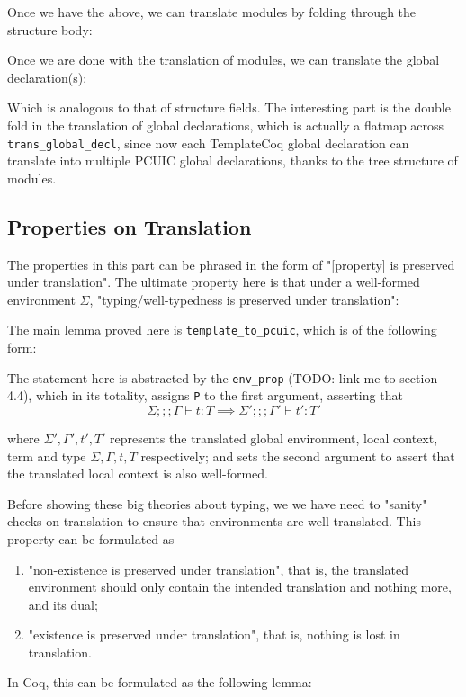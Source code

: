 Once we have the above, we can translate modules by folding through the
structure body:


Once we are done with the translation of modules, we can translate the global
declaration(s):


Which is analogous to that of structure fields. The interesting part is the
double fold in the translation of global declarations, which is actually a
flatmap across \verb|trans_global_decl|, since now each TemplateCoq global
declaration can translate into multiple PCUIC global declarations, thanks to the
tree structure of modules.


\subsection*{Properties on Translation}


The properties in this part can be phrased in the form of "[property] is
preserved under translation". The ultimate property here is that
under a well-formed environment $\Sigma$, "typing/well-typedness is preserved
under translation":


The main lemma proved here is \verb|template_to_pcuic|, which is of the
following form:


The statement here is abstracted by the \verb|env_prop| (TODO: link me to
section 4.4), which in its totality, assigns \verb|P| to the first argument,
asserting that
\[\Sigma ;;; \Gamma \vdash t: T \implies \Sigma' ;;; \Gamma' \vdash t' : T'\]

where $\Sigma', \Gamma', t', T'$ represents the translated global environment,
local context, term and type $\Sigma, \Gamma, t, T$ respectively; and sets the
second argument to assert that the translated local context is also well-formed.

Before showing these big theories about typing, we we have need to  "sanity"
checks on translation to ensure that environments are well-translated. This
property can be formulated as
\begin{enumerate}
  \item "non-existence is preserved under translation", that is, the translated
  environment should only contain the intended translation and nothing more, and
  its dual;
  \item "existence is preserved under translation", that is, nothing is lost in
  translation.
\end{enumerate}
 In Coq, this can be formulated as the following lemma:


